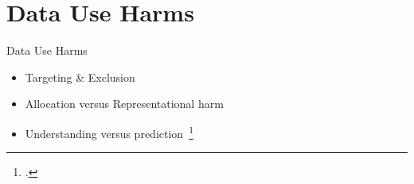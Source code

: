 \documentclass[main]{subfiles}
\begin{document}
\section{Data Use Harms}

\begin{frame}{Data Use Harms}
    \begin{itemize}
      \item Targeting \& Exclusion
      \item Allocation versus Representational harm
      \item Understanding versus prediction~\footcite{birhane2019algorithmic}
    \end{itemize}


\end{frame}
\end{document}
